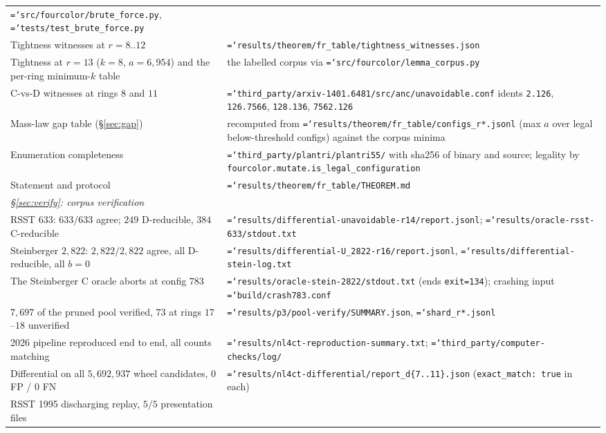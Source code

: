 \documentclass[11pt]{article}
\theoremstyle{definition}
\newcommand{\art}[1]{{\texttt{\hyphenchar\font=`\-\relax #1}}}
\begin{document}
{\begin{longtable}{p{}p{}}
  \art{src/fourcolor/brute\_force.py}, \art{tests/test\_brute\_force.py} \\
Tightness witnesses at $r=8..12$ &
  \art{results/theorem/fr\_table/tightness\_witnesses.json} \\
Tightness at $r=13$ ($k=8$, $a=6{,}954$) and the per-ring minimum-$k$ table &
  the labelled corpus via \art{src/fourcolor/lemma\_corpus.py} \\
C-vs-D witnesses at rings $8$ and $11$ &
  \art{third\_party/arxiv-1401.6481/src/anc/unavoidable.conf} idents
  \texttt{2.126}, \texttt{126.7566}, \texttt{128.136}, \texttt{7562.126} \\
Mass-law gap table (\S\ref{sec:gap}) &
  recomputed from \art{results/theorem/fr\_table/configs\_r*.jsonl}
  (max $a$ over legal below-threshold configs) against the corpus minima \\
Enumeration completeness &
  \art{third\_party/plantri/plantri55/} with sha256 of binary and source;
  legality by \texttt{fourcolor.mutate.is\_legal\_configuration} \\
Statement and protocol & \art{results/theorem/fr\_table/THEOREM.md} \\
\midrule
\multicolumn{2}{l}{\emph{\S\ref{sec:verify}: corpus verification}}\\[2pt]
RSST $633$: $633/633$ agree; $249$ D-reducible, $384$ C-reducible &
  \art{results/differential-unavoidable-r14/report.jsonl};
  \art{results/oracle-rsst-633/stdout.txt} \\
Steinberger $2{,}822$: $2{,}822/2{,}822$ agree, all D-reducible, all $b=0$ &
  \art{results/differential-U\_2822-r16/report.jsonl},
  \art{results/differential-stein-log.txt} \\
The Steinberger C oracle aborts at config $783$ &
  \art{results/oracle-stein-2822/stdout.txt} (ends \texttt{exit=134});
  crashing input \art{build/crash783.conf} \\
$7{,}697$ of the pruned pool verified, $73$ at rings $17$--$18$ unverified &
  \art{results/p3/pool-verify/SUMMARY.json}, \art{shard\_r*.jsonl} \\
2026 pipeline reproduced end to end, all counts matching &
  \art{results/nl4ct-reproduction-summary.txt};
  \art{third\_party/computer-checks/log/} \\
Differential on all $5{,}692{,}937$ wheel candidates, $0$ FP / $0$ FN &
  \art{results/nl4ct-differential/report\_d\{7..11\}.json}
  (\texttt{exact\_match: true} in each) \\
RSST 1995 discharging replay, $5/5$ presentation files &

\end{longtable}}
\end{document}
